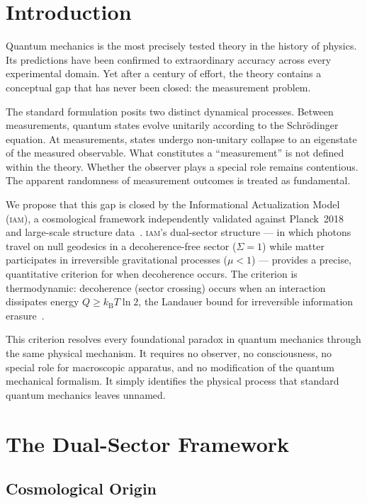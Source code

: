 \documentclass[12pt,letterpaper]{article}
\newcommand{\IAM}{\textsc{iam}}
\newcommand{\kB}{k_{\mathrm{B}}}
\begin{document}
\section{Introduction}

Quantum mechanics is the most precisely tested theory in the history of
physics. Its predictions have been confirmed to extraordinary accuracy
across every experimental domain. Yet after a century of effort, the
theory contains a conceptual gap that has never been closed: the
measurement problem.

The standard formulation posits two distinct dynamical processes. Between
measurements, quantum states evolve unitarily according to the
Schr\"{o}dinger equation. At measurements, states undergo non-unitary
collapse to an eigenstate of the measured observable. What constitutes a
``measurement'' is not defined within the theory. Whether the observer
plays a special role remains contentious. The apparent randomness of
measurement outcomes is treated as fundamental.

We propose that this gap is closed by the Informational Actualization
Model (\IAM), a cosmological framework independently validated against
Planck~2018 and large-scale structure data~\citep{Mahaffey2026a,
Mahaffey2026repo}. \IAM's dual-sector structure --- in which photons
travel on null geodesics in a decoherence-free sector ($\Sigma = 1$)
while matter participates in irreversible gravitational processes
($\mu < 1$) --- provides a precise, quantitative criterion for when
decoherence occurs. The criterion is thermodynamic: decoherence (sector
crossing) occurs when an interaction dissipates energy $Q \geq \kB T \ln
2$, the Landauer bound for irreversible information
erasure~\citep{Landauer1961}.

This criterion resolves every foundational paradox in quantum mechanics
through the same physical mechanism. It requires no observer, no
consciousness, no special role for macroscopic apparatus, and no
modification of the quantum mechanical formalism. It simply identifies
the physical process that standard quantum mechanics leaves unnamed.

\section{The Dual-Sector Framework}

\subsection{Cosmological Origin}
\end{document}
